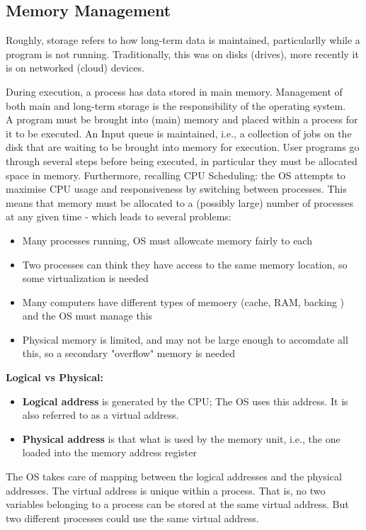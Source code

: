 \documentclass[a4paper, 10pt]{article}
\begin{document}
\subsection{Memory Management}
\begin{definitionbox}{}{}
    Roughly, storage refers to how long-term data is maintained,
    particularlly while a program is not running. Traditionally, this was on
    disks (drives), more recently it is on networked (cloud) devices.
\end{definitionbox}
During execution, a process has data stored in main memory. Management of both main and long-term storage is the responsibility of the operating system. \\[2ex]
A program must be brought into (main) memory and placed within a process for it to be executed. An Input queue is maintained, i.e., a collection of jobs on the disk that are waiting to be brought into memory for execution. User programs go through several steps before being executed, in particular they must be allocated space in memory.
Furthermore, recalling CPU Scheduling: the OS attempts to maximise CPU usage and responsiveness by switching between processes. This means that memory must be allocated to a (possibly large) number of processes at any given time - which leads to several problems:
\begin{itemize}
    \item Many processes running, OS must allowcate memory fairly to each
    \item Two processes can think they have access to the same memory location, so some virtualization is needed
    \item Many computers have different types of memoery (cache, RAM, backing ) and the OS must manage this
    \item Physical memory is limited, and may not be large enough to accomdate all this, so a secondary "overflow" memory is needed
\end{itemize}
\textbf{Logical vs Physical:}
\begin{itemize}
    \item \textbf{Logical address} is generated by the CPU; The OS uses this address. It is also referred to as a virtual address.
    \item \textbf{Physical address} is that what is used by the memory unit, i.e., the one loaded into the memory address register
\end{itemize}
The OS takes care of mapping between the logical addresses and the
physical addresses. The virtual address is unique within a process. That is, no two variables belonging to a process can be stored at the same virtual address. But two different processes could use the same virtual address.
\end{document}
